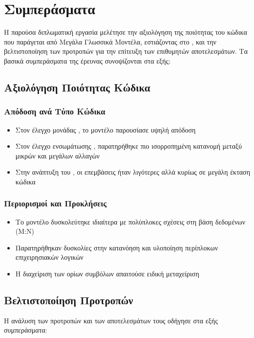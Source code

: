 \chapter{Συμπεράσματα}
\label{ch:chapter5}

Η παρούσα διπλωματική εργασία μελέτησε την αξιολόγηση της ποιότητας του κώδικα που παράγεται από Μεγάλα Γλωσσικά Μοντέλα, εστιάζοντας στο , και την βελτιστοποίηση των προτροπών για την επίτευξη των επιθυμητών αποτελεσμάτων. Τα βασικά συμπεράσματα της έρευνας συνοψίζονται στα εξής:

\section{Αξιολόγηση Ποιότητας Κώδικα}
\subsection*{Απόδοση ανά Τύπο Κώδικα}
\begin{itemize}
    \item Στον έλεγχο μονάδας , το μοντέλο παρουσίασε υψηλή απόδοση
    \item Στον έλεγχο ενσωμάτωσης , παρατηρήθηκε πιο ισορροπημένη κατανομή μεταξύ μικρών και μεγάλων αλλαγών
    \item Στην ανάπτυξη του , οι επεμβάσεις ήταν λιγότερες αλλά κυρίως σε μεγάλη έκταση κώδικα
\end{itemize}

\subsection*{Περιορισμοί και Προκλήσεις}
\begin{itemize}
    \item Το μοντέλο δυσκολεύτηκε ιδιαίτερα με πολύπλοκες σχέσεις στη βάση δεδομένων (Μ:Ν)
    \item Παρατηρήθηκαν δυσκολίες στην κατανόηση και υλοποίηση περίπλοκων επιχειρησιακών λογικών
    \item Η διαχείριση των ορίων συμβόλων  απαιτούσε ειδική μεταχείριση
\end{itemize}

\section{Βελτιστοποίηση Προτροπών}

Η ανάλυση των προτροπών και των αποτελεσμάτων τους οδήγησε στα εξής συμπεράσματα:

